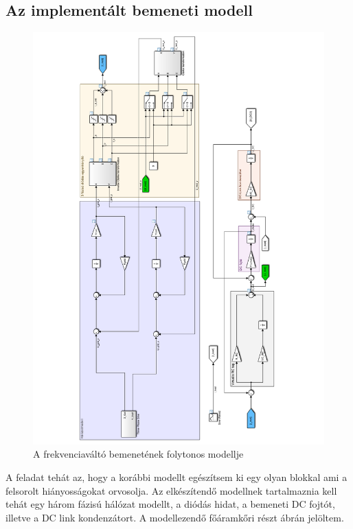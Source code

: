 \subsection{Az implementált bemeneti modell}

\begin{figure}[]
	\centering
	\includegraphics[width = 1.1\textwidth]{figures/model_continous.pdf}
	\caption{A frekvenciaváltó bemenetének folytonos modellje} 
	\label{fig:cont_input_model}
\end{figure}

A feladat tehát az, hogy a korábbi modellt egészítsem ki egy olyan blokkal ami a felsorolt hiányosságokat orvosolja. Az elkészítendő modellnek tartalmaznia kell tehát egy három fázisú hálózat modellt, a diódás hidat, a bemeneti DC fojtót, illetve a DC link kondenzátort. A modellezendő főáramkőri részt  ábrán jelöltem. 

